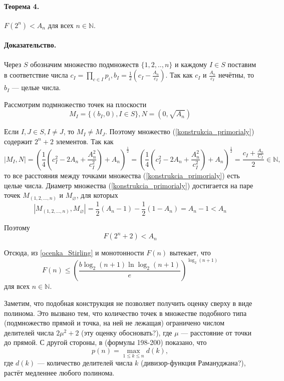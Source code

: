 \documentclass[a4paper,14pt]{article} %
\begin{document}
\paragraph{Теорема 4.}
$F(2^n)<A_n$ для всех $n\in\mathbb{N}$.

\paragraph{Доказательство.}
Через $S$ обозначим множество подмножеств $\{1,2,..,n\}$ и каждому $I\in S$ поставим в соответствие числа $c_I=\prod\limits_{c\in I}p_i, b_I=\frac{1}{2}\left(c_I-\frac{A_n}{c_I}\right)$.
Так как $c_I$ и $\frac{A_n}{c_I}$ нечётны, то $b_I$ --- целые числа.

Рассмотрим подмножество точек на плоскости
\begin{equation}\label{konstrukcia_primorialy}
M_I=\{(b_I,0), I\in S\}, N=(0, \sqrt{A_n})
\end{equation}


Если $I,J \in S, I \neq J$, то $M_I \neq M_J$.
Поэтому множество (\ref{konstrukcia_primorialy}) содержит $2^n+2$ элементов.
Так как
\begin{equation*}
	|M_I,N|=\left(\frac{1}{4}\left( c_I^2 - 2 A_n + \frac{A_n^2}{c_I^2} \right)+A_n\right)^\frac{1}{2}=
	\left(\frac{1}{4}\left( c_I^2 - 2 A_n + \frac{A_n^2}{c_I^2} \right)+A_n\right)^\frac{1}{2}=
	\frac{c_I+\frac{A_n}{C_I}}{2} \in \mathbb{N},
\end{equation*}
то все расстояния между точками множества (\ref{konstrukcia_primorialy}) есть целые числа.
Диаметр множества (\ref{konstrukcia_primorialy}) достигается на паре точек $M_{(1,2,...,n)}$ и $M_{\varnothing}$, для которых
$$
|M_{(1,2,...,n)},M_{\varnothing}|=\frac{1}{2}(A_n-1)-\frac{1}{2}(1-A_n) = A_n-1 < A_n
$$

Поэтому 
$$
F(2^n+2) < A_n
$$

Отсюда, из \ref{ocenka_Stirling} и монотонности $F(n)$ вытекает, что
\begin{equation}\label{ocenka_primoryaly}
F(n) \leq \left( \frac{b \log_2(n+1) \ln \log_2 (n+1)}{e}\right)^{\log_2(n+1)}
\end{equation}
для всех $n\in \mathbb{N}$.


Заметим, что подобная конструкция не позволяет получить оценку сверху в виде полинома.
Это вызвано тем, что количество точек в множестве подобного типа (подмножество прямой и точка, на ней не лежащая) ограничено числом  делителей числа $2\mu^2+2$ (эту оценку обосновать?), где $\mu$ --- расстояние от точки до прямой.
С другой стороны, в \cite{Ramanujan} (формулы 198-200) показано, что
$$
p(n)=\max\limits_{1\leq k \leq n} d(k),
$$
где $d(k)$ --- количество делителей числа $k$ (дивизор-функция Рамануджана?),
растёт медленнее любого полинома.
\end{document}
